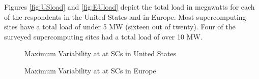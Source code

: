 Figures \ref{fig:USload} and \ref{fig:EUload} depict the total load in megawatts for each of the respondents in the United States and in Europe. Most supercomputing sites have a total load of under 5 MW (sixteen out of twenty). Four of the surveyed supercomputing sites had a total load of over 10 MW. 

\begin{figure}[ht!]
\begin{center}
\caption{Maximum Variability at at SCs in United States}
\label{fig:USvar}
\vspace{0.9cm}
\caption{Maximum Variability at at SCs in Europe}
\label{fig:EUvar}
\end{center}
\end{figure}

